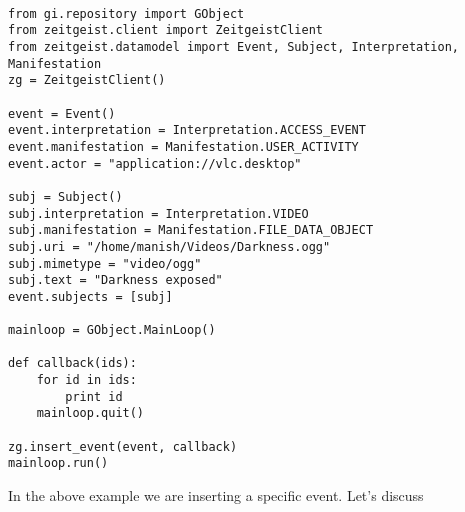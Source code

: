 \begin{center}
\begin{verbatim}

from gi.repository import GObject
from zeitgeist.client import ZeitgeistClient
from zeitgeist.datamodel import Event, Subject, Interpretation, Manifestation
zg = ZeitgeistClient()

event = Event()
event.interpretation = Interpretation.ACCESS_EVENT
event.manifestation = Manifestation.USER_ACTIVITY
event.actor = "application://vlc.desktop"

subj = Subject()
subj.interpretation = Interpretation.VIDEO
subj.manifestation = Manifestation.FILE_DATA_OBJECT
subj.uri = "/home/manish/Videos/Darkness.ogg"
subj.mimetype = "video/ogg"
subj.text = "Darkness exposed"
event.subjects = [subj]

mainloop = GObject.MainLoop()

def callback(ids):
	for id in ids:
		print id
	mainloop.quit()

zg.insert_event(event, callback)
mainloop.run()

\end{verbatim}
\end{center}

\noindent
In the above example we are inserting a specific event. Let's discuss

